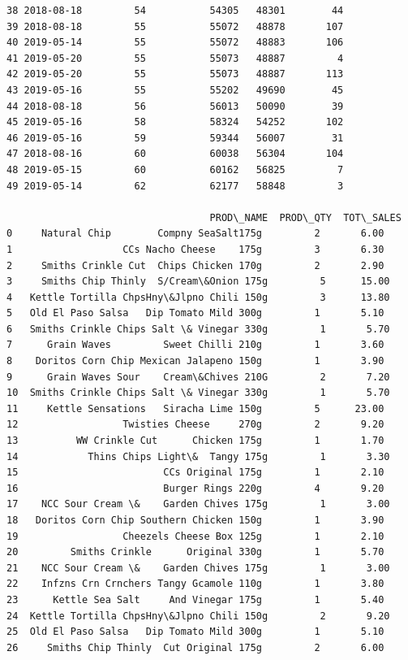 \documentclass[11pt]{article}
\begin{document}
\begin{tcolorbox}[breakable, size=fbox, boxrule=.5pt, pad at break*=1mm, opacityfill=0]
\begin{Verbatim}[commandchars=\\\{\}]
38 2018-08-18         54           54305   48301        44
39 2018-08-18         55           55072   48878       107
40 2019-05-14         55           55072   48883       106
41 2019-05-20         55           55073   48887         4
42 2019-05-20         55           55073   48887       113
43 2019-05-16         55           55202   49690        45
44 2018-08-18         56           56013   50090        39
45 2019-05-16         58           58324   54252       102
46 2019-05-16         59           59344   56007        31
47 2018-08-16         60           60038   56304       104
48 2019-05-15         60           60162   56825         7
49 2019-05-14         62           62177   58848         3

                                   PROD\_NAME  PROD\_QTY  TOT\_SALES
0     Natural Chip        Compny SeaSalt175g         2       6.00
1                   CCs Nacho Cheese    175g         3       6.30
2     Smiths Crinkle Cut  Chips Chicken 170g         2       2.90
3     Smiths Chip Thinly  S/Cream\&Onion 175g         5      15.00
4   Kettle Tortilla ChpsHny\&Jlpno Chili 150g         3      13.80
5   Old El Paso Salsa   Dip Tomato Mild 300g         1       5.10
6   Smiths Crinkle Chips Salt \& Vinegar 330g         1       5.70
7      Grain Waves         Sweet Chilli 210g         1       3.60
8    Doritos Corn Chip Mexican Jalapeno 150g         1       3.90
9      Grain Waves Sour    Cream\&Chives 210G         2       7.20
10  Smiths Crinkle Chips Salt \& Vinegar 330g         1       5.70
11     Kettle Sensations   Siracha Lime 150g         5      23.00
12                  Twisties Cheese     270g         2       9.20
13          WW Crinkle Cut      Chicken 175g         1       1.70
14            Thins Chips Light\&  Tangy 175g         1       3.30
15                         CCs Original 175g         1       2.10
16                         Burger Rings 220g         4       9.20
17    NCC Sour Cream \&    Garden Chives 175g         1       3.00
18   Doritos Corn Chip Southern Chicken 150g         1       3.90
19                  Cheezels Cheese Box 125g         1       2.10
20         Smiths Crinkle      Original 330g         1       5.70
21    NCC Sour Cream \&    Garden Chives 175g         1       3.00
22    Infzns Crn Crnchers Tangy Gcamole 110g         1       3.80
23      Kettle Sea Salt     And Vinegar 175g         1       5.40
24  Kettle Tortilla ChpsHny\&Jlpno Chili 150g         2       9.20
25  Old El Paso Salsa   Dip Tomato Mild 300g         1       5.10
26     Smiths Chip Thinly  Cut Original 175g         2       6.00

\end{Verbatim}
\end{tcolorbox}
\end{document}
